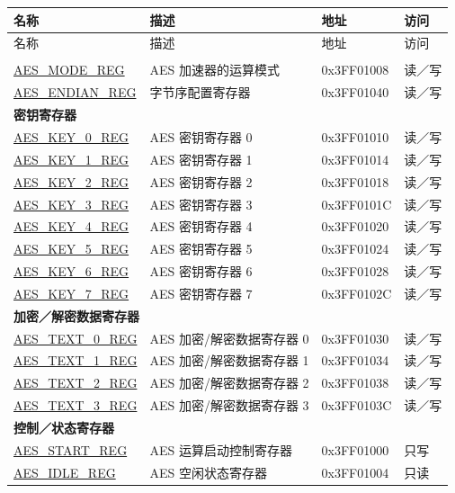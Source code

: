 \begin{longtable}{ | p{4cm} | p{7.5cm} | p{2cm} | p{1.5cm} | }
\hline\rowcolor{lightgray}
名称 & 描述 &  地址 & 访问 \\ \hline
\endfirsthead
        \hline
        \rowcolor{lightgray}
       名称 & 描述 & 地址 & 访问  \\
        \hline
        \endhead
        \endfoot
\multicolumn{4}{|l|}{\textbf{配置寄存器}} \\ \hline
\hyperref[regdesc:AESMODEREG]{AES\_MODE\_REG} & AES 加速器的运算模式 & 0x3FF01008 & 读／写 \\ \hline
\hyperref[regdesc:AESENDIANREG]{AES\_ENDIAN\_REG} & 字节序配置寄存器 & 0x3FF01040 & 读／写 \\ \hline
\multicolumn{4}{|l|}{\textbf{密钥寄存器}} \\ \hline
\hyperref[regdesc:AESKEYnREG]{AES\_KEY\_0\_REG} & AES 密钥寄存器 0 & 0x3FF01010 & 读／写 \\ \hline
\hyperref[regdesc:AESKEYnREG]{AES\_KEY\_1\_REG} & AES 密钥寄存器 1 & 0x3FF01014 & 读／写 \\ \hline
\hyperref[regdesc:AESKEYnREG]{AES\_KEY\_2\_REG} & AES 密钥寄存器 2 & 0x3FF01018 & 读／写 \\ \hline
\hyperref[regdesc:AESKEYnREG]{AES\_KEY\_3\_REG} & AES 密钥寄存器 3 & 0x3FF0101C & 读／写 \\ \hline
\hyperref[regdesc:AESKEYnREG]{AES\_KEY\_4\_REG} & AES 密钥寄存器 4 & 0x3FF01020 & 读／写 \\ \hline
\hyperref[regdesc:AESKEYnREG]{AES\_KEY\_5\_REG} & AES 密钥寄存器 5 & 0x3FF01024 & 读／写 \\ \hline
\hyperref[regdesc:AESKEYnREG]{AES\_KEY\_6\_REG} & AES 密钥寄存器 6 & 0x3FF01028 & 读／写 \\ \hline
\hyperref[regdesc:AESKEYnREG]{AES\_KEY\_7\_REG} & AES 密钥寄存器 7 & 0x3FF0102C & 读／写 \\ \hline
\multicolumn{4}{|l|}{\textbf{加密／解密数据寄存器}} \\ \hline
\hyperref[regdesc:AESTEXTnREG]{AES\_TEXT\_0\_REG} & AES 加密/解密数据寄存器 0 & 0x3FF01030 & 读／写 \\ \hline
\hyperref[regdesc:AESTEXTnREG]{AES\_TEXT\_1\_REG} & AES 加密/解密数据寄存器 1 & 0x3FF01034 & 读／写 \\ \hline
\hyperref[regdesc:AESTEXTnREG]{AES\_TEXT\_2\_REG} & AES 加密/解密数据寄存器 2 & 0x3FF01038 & 读／写 \\ \hline
\hyperref[regdesc:AESTEXTnREG]{AES\_TEXT\_3\_REG} & AES 加密/解密数据寄存器 3 & 0x3FF0103C & 读／写 \\ \hline
\multicolumn{4}{|l|}{\textbf{控制／状态寄存器}} \\ \hline
\hyperref[regdesc:AESSTARTREG]{AES\_START\_REG} & AES 运算启动控制寄存器 & 0x3FF01000 & 只写 \\ \hline
\hyperref[regdesc:AESIDLEREG]{AES\_IDLE\_REG} & AES 空闲状态寄存器 & 0x3FF01004 & 只读 \\ \hline
\end{longtable}
